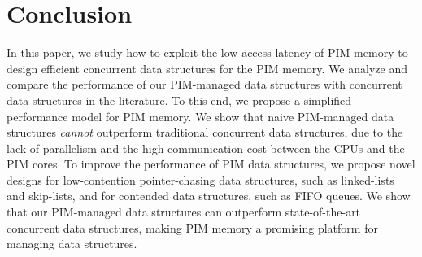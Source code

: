 \section{Conclusion}
\label{section:conclusion}
In this paper, we study how to exploit the low access latency 
of PIM memory to design efficient concurrent data structures for the PIM memory.
We analyze and compare the performance of our PIM-managed data structures with 
concurrent data structures in the literature.
To this end, we propose a simplified performance model for PIM memory. 
We show that naive PIM-managed data structures \emph{cannot} outperform traditional concurrent data structures, 
due to the lack of parallelism and the high communication cost between the CPUs and the PIM cores.  
To improve the performance of PIM data structures, we propose novel designs for low-contention 
pointer-chasing data structures, such as linked-lists and skip-lists, and for contended  
data structures, such as FIFO queues. 
We show that our PIM-managed data structures can outperform state-of-the-art concurrent 
data structures, making PIM memory a promising platform for managing data structures.

 